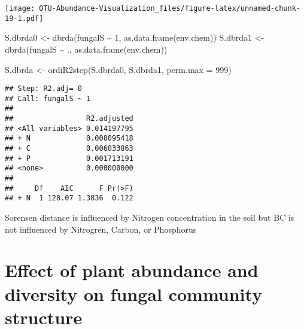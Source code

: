 \documentclass[
]{article}
\newenvironment{Shaded}{\begin{snugshade}}{\end{snugshade}}
\newcommand{\AttributeTok}[1]{\textcolor[rgb]{0.77,0.63,0.00}{#1}}
\newcommand{\DecValTok}[1]{\textcolor[rgb]{0.00,0.00,0.81}{#1}}
\newcommand{\FunctionTok}[1]{\textcolor[rgb]{0.00,0.00,0.00}{#1}}
\newcommand{\NormalTok}[1]{#1}
\newcommand{\OtherTok}[1]{\textcolor[rgb]{0.56,0.35,0.01}{#1}}
\newcommand{\SpecialCharTok}[1]{\textcolor[rgb]{0.00,0.00,0.00}{#1}}
\begin{document}
\texttt{[image: OTU-Abundance-Visualization\_files/figure-latex/unnamed-chunk-19-1.pdf]}

\begin{Shaded}
\begin{Highlighting}[]
\NormalTok{S.dbrda0 }\OtherTok{\textless{}{-}} \FunctionTok{dbrda}\NormalTok{(fungalS }\SpecialCharTok{\textasciitilde{}} \DecValTok{1}\NormalTok{, }\FunctionTok{as.data.frame}\NormalTok{(env.chem))}
\NormalTok{S.dbrda1 }\OtherTok{\textless{}{-}} \FunctionTok{dbrda}\NormalTok{(fungalS }\SpecialCharTok{\textasciitilde{}}\NormalTok{ ., }\FunctionTok{as.data.frame}\NormalTok{(env.chem))}

\NormalTok{S.dbrda }\OtherTok{\textless{}{-}} \FunctionTok{ordiR2step}\NormalTok{(S.dbrda0, S.dbrda1, }\AttributeTok{perm.max =} \DecValTok{999}\NormalTok{)}
\end{Highlighting}
\end{Shaded}

\begin{verbatim}
## Step: R2.adj= 0 
## Call: fungalS ~ 1 
##  
##                 R2.adjusted
## <All variables> 0.014197795
## + N             0.008095418
## + C             0.006033863
## + P             0.001713191
## <none>          0.000000000
## 
##     Df    AIC      F Pr(>F)
## + N  1 128.07 1.3836  0.122
\end{verbatim}

Sorensen distance is influenced by Nitrogen concentration in the soil
but BC is not influenced by Nitrogren, Carbon, or Phosphorus

\hypertarget{effect-of-plant-abundance-and-diversity-on-fungal-community-structure}{%
\section{Effect of plant abundance and diversity on fungal community
structure}\label{effect-of-plant-abundance-and-diversity-on-fungal-community-structure}}
\end{document}
